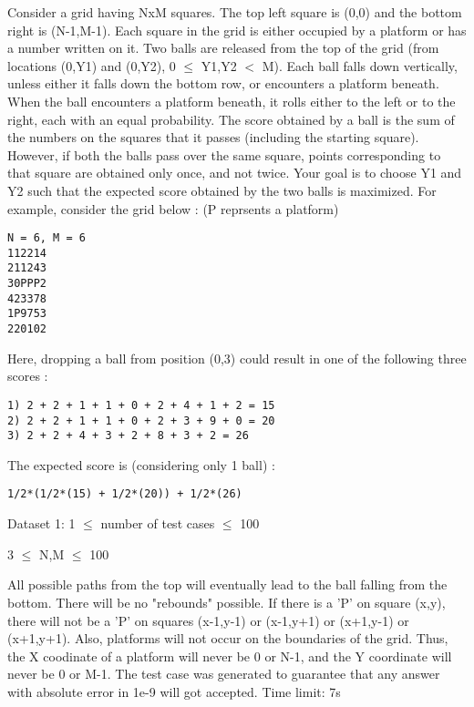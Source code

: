 Consider a grid having NxM squares. The top left square is (0,0) and the bottom right is (N-1,M-1). Each square in the grid is either occupied by a platform or has a number written on it. Two balls are released from the top of the grid (from locations (0,Y1) and (0,Y2), 0  $\le$  Y1,Y2 $<$ M). Each ball falls down vertically, unless either it falls down the bottom row, or encounters a platform beneath. When the ball encounters a platform beneath, it rolls either to the left or to the right, each with an equal probability. The score obtained by a ball is the sum of the numbers on the squares that it passes (including the starting square). However, if both the balls pass over the same square, points corresponding to that square are obtained only once, and not twice. Your goal is to choose Y1 and Y2 such that the expected score obtained by the two balls is maximized. For example, consider the grid below : (P reprsents a platform)  
\begin{verbatim}
N = 6, M = 6
112214
211243
30PPP2
423378
1P9753
220102
\end{verbatim}

   Here, dropping a ball from position (0,3) could result in one of the following three scores :  
\begin{verbatim}
1) 2 + 2 + 1 + 1 + 0 + 2 + 4 + 1 + 2 = 15 
2) 2 + 2 + 1 + 1 + 0 + 2 + 3 + 9 + 0 = 20
3) 2 + 2 + 4 + 3 + 2 + 8 + 3 + 2 = 26
\end{verbatim}

   The expected score is (considering only 1 ball) :  
\begin{verbatim}
1/2*(1/2*(15) + 1/2*(20)) + 1/2*(26)\end{verbatim}

Dataset 1: 1  $\le$  number of test cases  $\le$  100  

   3  $\le$  N,M  $\le$  100  

   All possible paths from the top will eventually lead to the ball falling from the bottom. There will be no "rebounds" possible. If there is a 'P' on square (x,y), there will not be a 'P' on squares (x-1,y-1) or (x-1,y+1) or (x+1,y-1) or (x+1,y+1). Also, platforms will not occur on the boundaries of the grid. Thus, the X coodinate of a platform will never be 0 or N-1, and the Y coordinate will never be 0 or M-1. The test case was generated to guarantee that any answer with absolute error in 1e-9 will got accepted. Time limit: 7s
